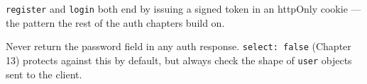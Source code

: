 \begin{notebox}[NOTE]
\texttt{register} and \texttt{login} both end by issuing a signed token in an httpOnly cookie --- the pattern the rest of the auth chapters build on.
\end{notebox}

\begin{warnbox}[WARNING]
Never return the password field in any auth response. \texttt{select: false} (Chapter 13) protects against this by default, but always check the shape of \texttt{user} objects sent to the client.
\end{warnbox}
